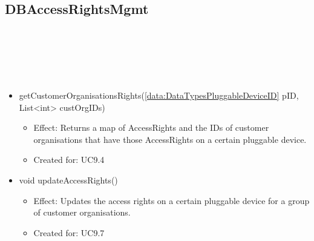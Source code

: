   \subsection{DBAccessRightsMgmt}\label{int:DeviceDatabaseDeviceDBDBAccessRightsMgmt}
    \begin{description}
      \item[Provided by:] \iconcomponent{}~
      \item[Required by:] \iconcomponent{}~
      \item[Operations:] ~
    \begin{itemize}[noitemsep,nolistsep,leftmargin=-.25cm]
      \item \textsf{ getCustomerOrganisationsRights(\ref{data:DataTypesPluggableDeviceID} pID, List\textless{}int\textgreater{} custOrgIDs)}
        \begin{itemize}[noitemsep,nolistsep]
           \item Effect: Returns a map of AccessRights and the IDs of customer organisations that have those AccessRights on a certain pluggable device.
\item Created for: UC9.4
        \end{itemize}
      \item \textsf{void updateAccessRights()}
        \begin{itemize}[noitemsep,nolistsep]
           \item Effect: Updates the access rights on a certain pluggable device for a group of customer organisations.
\item Created for: UC9.7
        \end{itemize}
    \end{itemize}
    \end{description}

